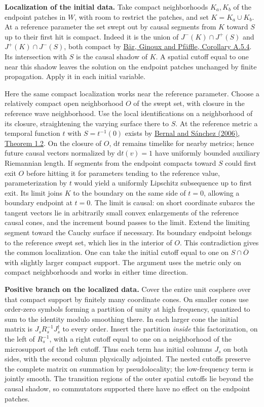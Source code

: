 \documentclass[
  english,
  11pt,
  reqno]{amsart}
\makeatletter
\newcommand{\paperleadspace}{%
  \par\if@nobreak\else
    \addpenalty{\@secpenalty}\addvspace{.5\baselineskip}%
  \fi}
\newcommand{\paperleadin}[1]{%
  \ifvmode\paperleadspace\fi
  \textbf{#1}}
\makeatother
\begin{document}
\paperleadin{Localization of the initial data.} Take compact neighborhoods
\(K_a,K_b\) of the endpoint patches in \(W\), with room to restrict the
patches, and set \(K=K_a\cup K_b\). At a reference parameter the set
swept out by causal segments from \(K\) toward \(S\) up to their first
hit is compact. Indeed it is the union of \(J^-(K)\cap J^+(S)\) and
\(J^+(K)\cap J^-(S)\), both compact by
\hyperref[ref-BarGinouxPfaffle2007]{Bär, Ginoux and Pfäffle, Corollary
A.5.4}. Its intersection with \(S\) is the causal shadow of \(K\). A
spatial cutoff equal to one near this shadow leaves the solution on the
endpoint patches unchanged by finite propagation. Apply it in each
initial variable.

Here the same compact localization works near the reference parameter.
Choose a relatively compact open neighborhood \(O\) of the swept set,
with closure in the reference wave neighborhood. Use the local
identifications on a neighborhood of its closure, straightening the
varying surface there to \(S\). At the reference metric a temporal
function \(t\) with \(S=t^{-1}(0)\) exists by
\hyperref[ref-BernalSanchez2006]{Bernal and Sánchez (2006), Theorem
1.2}. On the closure of \(O\), \(\mathrm dt\) remains timelike for
nearby metrics; hence future causal vectors normalized by
\(\mathrm dt(v)=1\) have uniformly bounded auxiliary Riemannian length.
If segments from the endpoint compacts toward \(S\) could first exit
\(O\) before hitting it for parameters tending to the reference value,
parameterization by \(t\) would yield a uniformly Lipschitz subsequence
up to first exit. Its limit joins \(K\) to the boundary on the same side
of \(t=0\), allowing a boundary endpoint at \(t=0\). The limit is
causal: on short coordinate subarcs the tangent vectors lie in
arbitrarily small convex enlargements of the reference causal cones, and
the increment bound passes to the limit. Extend the limiting segment
toward the Cauchy surface if necessary. Its boundary endpoint belongs to
the reference swept set, which lies in the interior of \(O\). This
contradiction gives the common localization. One can take the initial
cutoff equal to one on \(S\cap\overline O\) with slightly larger compact
support. The argument uses the metric only on compact neighborhoods and
works in either time direction.

\paperleadin{Positive branch on the localized data.} Cover the entire unit
cosphere over that compact support by finitely many coordinate cones. On
smaller cones use order-zero symbols forming a partition of unity at
high frequency, quantized to sum to the identity modulo smoothing there.
In each larger cone the initial matrix is \(J_sR_s^{-1}J_s^\dagger\) to
every order. Insert the partition \emph{inside} this factorization, on
the left of \(R_s^{-1}\), with a right cutoff equal to one on a
neighborhood of the microsupport of the left cutoff. Thus each term has
initial columns \(J_s\) on both sides, with the second column physically
adjointed. The nested cutoffs preserve the complete matrix on summation
by pseudolocality; the low-frequency term is jointly smooth. The
transition regions of the outer spatial cutoffs lie beyond the causal
shadow, so commutators supported there have no effect on the endpoint
patches.
\end{document}
